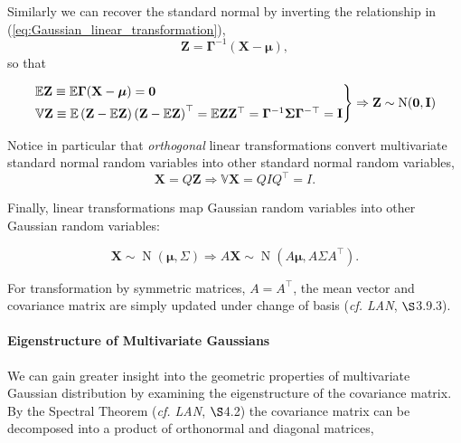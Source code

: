\documentclass[12pt, twoside, draft]{article}
\begin{document}
Similarly we can recover the standard normal by inverting the relationship in (\ref{eq:Gaussian_linear_transformation}),
\begin{equation}
\mathbf{Z} = \boldsymbol{\Gamma}^{-1} (\mathbf{X} - \boldsymbol{\mu}),
\end{equation}
so that

\begin{equation}
\begin{rcases}
\mathbb{E}\mathbf{Z} \equiv \mathbb{E} \boldsymbol{\Gamma}( \mathbf{X} - \boldsymbol{\mu}) = \mathbf{0} \\
\mathbb{V}\mathbf{Z} \equiv \mathbb{E}\left(\mathbf{Z} - \mathbb{E}\mathbf{Z} \right) \left( \mathbf{Z} - \mathbb{E} \mathbf{Z} \right)^\top = \mathbb{E}\mathbf{Z}\mathbf{Z}^\top = \boldsymbol{\Gamma}^{-1} \boldsymbol{\Sigma} \boldsymbol{\Gamma}^{-\top} = \mathbf{I}
\end{rcases} \Rightarrow \mathbf{Z} \sim \operatorname{N}(\mathbf{0}, \mathbf{I})
\end{equation}

Notice in particular that \textit{orthogonal} linear transformations convert multivariate standard normal random variables into other standard normal random variables, 
\begin{equation}
\mathbf{X} = Q\mathbf{Z} \Rightarrow \mathbb{V}\mathbf{X} = QIQ^\top = I.
\end{equation}

Finally, linear transformations map Gaussian random variables into other Gaussian random variables:

\begin{equation}
\mathbf{X} \sim \operatorname{N}(\boldsymbol{\mu}, \Sigma) \Rightarrow A\mathbf{X} \sim \operatorname{N}(A\boldsymbol{\mu}, A \Sigma A^\top).
\end{equation}

For transformation by symmetric matrices, $A = A^\top$, the mean vector and covariance matrix are simply updated under change of basis (\textit{cf. LAN}, $\S$3.9.3).


\paragraph{Eigenstructure of Multivariate Gaussians}
We can gain greater insight into the geometric properties of multivariate Gaussian distribution by examining the eigenstructure of the covariance matrix.   By the Spectral Theorem (\textit{cf. LAN}, $\S$4.2) the covariance matrix can be decomposed into a product of orthonormal and diagonal matrices,
\end{document}
